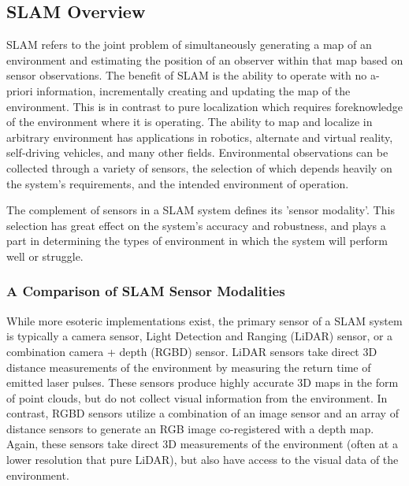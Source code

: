 \subsection{SLAM Overview}

SLAM refers to the joint problem of simultaneously generating a map of an environment and estimating the position of an observer within that map based on sensor observations. The benefit of SLAM is the ability to operate with no a-priori information, incrementally creating and updating the map of the environment. This is in contrast to pure localization which requires foreknowledge of the environment where it is operating. The ability to map and localize in arbitrary environment has applications in robotics, alternate and virtual reality, self-driving vehicles, and many other fields. Environmental observations can be collected through a variety of sensors, the selection of which depends heavily on the system's requirements, and the intended environment of operation.

The complement of sensors in a SLAM system defines its 'sensor modality'. This selection has great effect on the system's accuracy and robustness, and plays a part in determining the types of environment in which the system will perform well or struggle.

\subsubsection{A Comparison of SLAM Sensor Modalities}

While more esoteric implementations exist, the primary sensor of a SLAM system is typically a camera sensor, Light Detection and Ranging (LiDAR) sensor, or a combination camera + depth (RGBD) sensor. LiDAR sensors take direct 3D distance measurements of the environment by measuring the return time of emitted laser pulses. These sensors produce highly accurate 3D maps in the form of point clouds, but do not collect visual information from the environment. In contrast, RGBD sensors utilize a combination of an image sensor and an array of distance sensors to generate an RGB image co-registered with a depth map. Again, these sensors take direct 3D measurements of the environment (often at a lower resolution that pure LiDAR), but also have access to the visual data of the environment.

